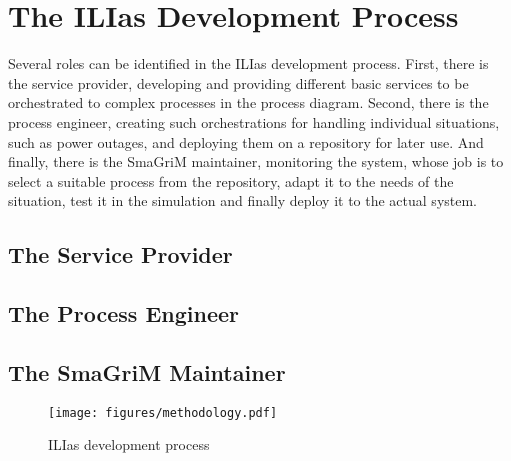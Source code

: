 
\section{The ILIas Development Process}


Several roles can be identified in the ILIas development process.  First, there
is the service provider, developing and providing different basic services to be
orchestrated to complex processes in the process diagram.  Second, there is the
process engineer, creating such orchestrations for handling individual situations,
such as power outages, and deploying them on a repository for later use.  And
finally, there is the SmaGriM maintainer, monitoring the system, whose job is to
select a suitable process from the repository, adapt it to the needs of the
situation, test it in the simulation and finally deploy it to the actual system.


\subsection{The Service Provider}

\subsection{The Process Engineer}

\subsection{The SmaGriM Maintainer}


\begin{figure}
	\centering
	\texttt{[image: figures/methodology.pdf]}
	\caption{ILIas development process}
	\label{fig:ilias-process}
\end{figure}



